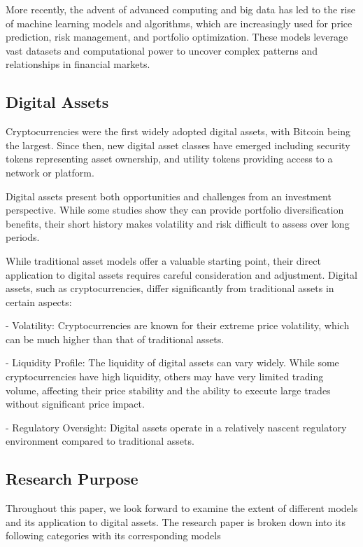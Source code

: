 More recently, the advent of advanced computing and big data has led to the rise of machine learning models and algorithms, which are increasingly used for price prediction, risk management, and portfolio optimization. These models leverage vast datasets and computational power to uncover complex patterns and relationships in financial markets.

\subsection{Digital Assets}

Cryptocurrencies were the first widely adopted digital assets, with Bitcoin being the largest. Since then, new digital asset classes have emerged including security tokens representing asset ownership, and utility tokens providing access to a network or platform.

Digital assets present both opportunities and challenges from an investment perspective. While some studies show they can provide portfolio diversification benefits, their short history makes volatility and risk difficult to assess over long periods.

While traditional asset models offer a valuable starting point, their direct application to digital assets requires careful consideration and adjustment. Digital assets, such as cryptocurrencies, differ significantly from traditional assets in certain aspects:

- Volatility: Cryptocurrencies are known for their extreme price volatility, which can be much higher than that of traditional assets.

- Liquidity Profile: The liquidity of digital assets can vary widely. While some cryptocurrencies have high liquidity, others may have very limited trading volume, affecting their price stability and the ability to execute large trades without significant price impact.

- Regulatory Oversight: Digital assets operate in a relatively nascent regulatory environment compared to traditional assets.

\subsection{Research Purpose}

Throughout this paper, we look forward to examine the extent of different models and its application to digital assets. The research paper is broken down into its following categories with its corresponding models

